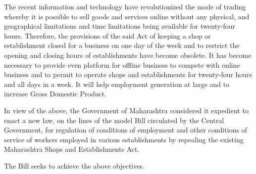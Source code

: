 \documentclass[gaz8,ordinance]{mhact}
\begin{document}
            \begin{sor}

          
\begin{sorlist}

          \item The recent information and technology have revolutionized the mode 
of trading whereby it is possible to sell goods and services online without 
any physical, and geographical limitations and time limitations being available 
for twenty-four hours. Therefore, the provisions of the said Act of keeping a 
shop or establishment closed for a business on one day of the week and to 
restrict the opening and closing hours of establishments have become obsolete. 
It has become necessary to provide even platform for offline business to 
compete with online business and to permit to operate shops and 
establishments for twenty-four hours and all days in a week. It will help 
employment generation at large and to increase Gross Domestic Product.
          
          \item In view of the above, the Government of Maharashtra considered it 
expedient to enact a new law, on the lines of the model Bill circulated by the 
Central Government, for regulation of conditions of employment and other 
conditions of service of workers employed in various establishments by 
repealing the existing Maharashtra Shops and Establishments Act. 
          
          \item The Bill seeks to achieve the above objectives. 
          

\end{sorlist}
\end{sor}
\end{document}
